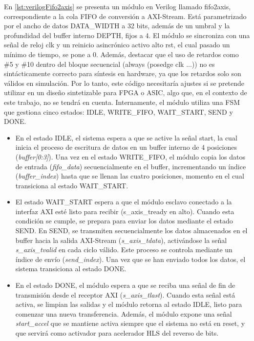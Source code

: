 \begin{adjustwidth}{1.5cm}{}
En \ref{lst:verilogFifo2axis} se presenta un módulo en Verilog llamado fifo2axis, correspondiente a la cola FIFO de conversión a AXI-Stream. Está parametrizado por el ancho de datos DATA\_WIDTH a 32 bits, además de un umbral y la profundidad del buffer interno DEPTH, fijos a 4. El módulo se sincroniza con una señal de reloj clk y un reinicio asincrónico activo alto rst, el cual pasado un mínimo de tiempo, se pone a 0. Además, destacar que el uso de retardos como \#5 y \#10 dentro del bloque secuencial (always \@(posedge clk ...)) no es sintácticamente correcto para síntesis en hardware, ya que los retardos solo son válidos en simulación. Por lo tanto, este código necesitaría ajustes si se pretende utilizar en un diseño sintetizable para FPGA o ASIC, algo que, en el contexto de este trabajo, no se tendrá en cuenta. Internamente, el módulo utiliza una \ac{FSM} que gestiona cinco estados: IDLE, WRITE\_FIFO, WAIT\_START, SEND y DONE. 

\begin{itemize}
    \item En el estado IDLE, el sistema espera a que se active la señal start, la cual inicia el proceso de escritura de datos en un buffer interno de 4 posiciones (\emph{buffer[0:3]}). Una vez en el estado WRITE\_FIFO, el módulo copia los datos de entrada (\emph{fifo\_data}) secuencialmente en el buffer, incrementando un índice (\emph{buffer\_index}) hasta que se llenan las cuatro posiciones, momento en el cual transiciona al estado WAIT\_START.
    
    \item El estado WAIT\_START espera a que el módulo esclavo conectado a la interfaz AXI esté listo para recibir (s\_axis\_tready en alto). Cuando esta condición se cumple, se prepara para enviar los datos mediante el estado SEND. En SEND, se transmiten secuencialmente los datos almacenados en el buffer hacia la salida AXI-Stream (\emph{s\_axis\_tdata}), activándose la señal \emph{s\_axis\_tvalid} en cada ciclo válido. Este proceso se controla mediante un índice de envío (\emph{send\_index}). Una vez que se han enviado todos los datos, el sistema transiciona al estado DONE.
    
    \item En el estado DONE, el módulo espera a que se reciba una señal de fin de transmisión desde el receptor AXI (\emph{s\_axis\_tlast}). Cuando esta señal está activa, se limpian las salidas y el módulo retorna al estado IDLE, listo para comenzar una nueva transferencia. Además, el módulo expone una señal \emph{start\_accel} que se mantiene activa siempre que el sistema no está en reset, y que servirá como activador para acelerador HLS del reverso de bits.
\end{itemize}


\end{adjustwidth}
